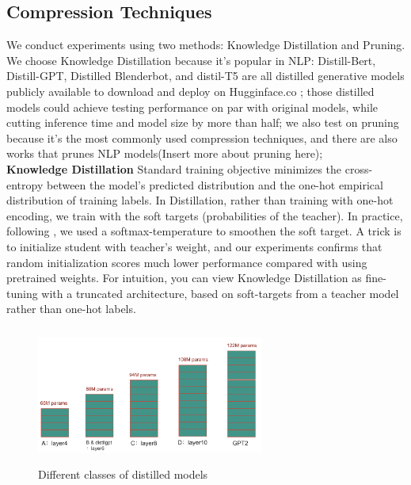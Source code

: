 
\subsection{Compression Techniques}
We conduct experiments using two methods:  Knowledge Distillation and Pruning. We choose Knowledge Distillation because it’s popular in NLP: Distill-Bert\cite{Sanh2019DistilBERTAD}, Distill-GPT, Distilled Blenderbot, and distil-T5 are all distilled generative models publicly available to download and deploy on Hugginface.co \cite{wolf-etal-2020-transformers}; those distilled models could achieve testing performance on par with original models, while cutting inference time and model size by more than half; we also test on pruning because it's the most commonly used compression techniques, and there are also works that prunes NLP models(Insert more about pruning here);\\


\noindent \textbf{Knowledge Distillation} \quad Standard training objective minimizes the cross-entropy between the model’s predicted distribution and the one-hot empirical distribution of training labels. In Distillation, rather than training with one-hot encoding, we train with the soft targets (probabilities of the teacher).  In practice, following \cite{Hinton2015DistillingTK}, we used a softmax-temperature to smoothen the soft target. A trick is to initialize student with teacher’s weight, and our experiments confirms that random initialization scores much lower performance compared with using pretrained weights. For intuition, you can view Knowledge Distillation as fine-tuning with a truncated architecture, based on soft-targets from a teacher model rather than one-hot labels. \\

\begin{figure}[ht]
\includegraphics[width=7.5cm, height=4.5cm]{graphs/white_distill.png}
\caption{Different classes of distilled models}
\centering
\label{fig: distill}
\end{figure}


